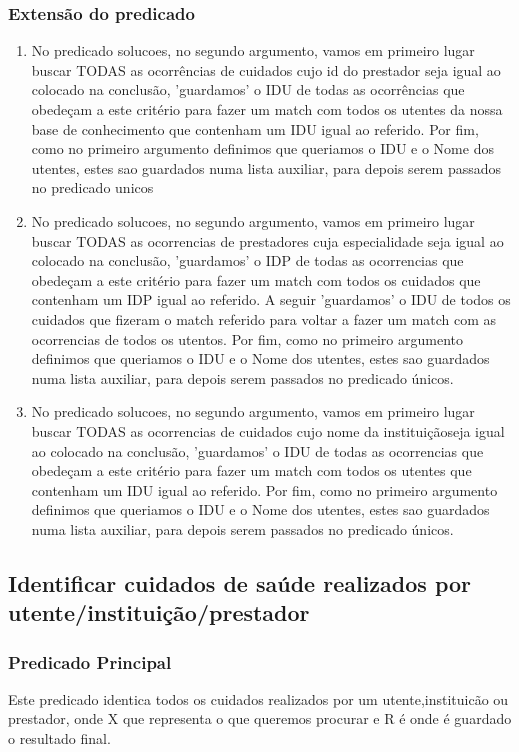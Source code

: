\documentclass[a4paper]{report} %
\begin{document}
\subsubsection{Extensão do predicado}
\begin{enumerate}
\item No predicado solucoes, no segundo argumento, vamos em primeiro lugar buscar TODAS as ocorrências de cuidados cujo id do prestador seja igual ao colocado na conclusão, 'guardamos' o IDU de todas as ocorrências que obedeçam a este critério para fazer um match com todos os utentes da nossa base de conhecimento  que contenham um IDU igual ao referido. Por fim, como no primeiro argumento definimos que queriamos o IDU e o Nome dos utentes, estes sao guardados numa lista auxiliar, para depois serem passados no predicado unicos
\item No predicado solucoes, no segundo argumento, vamos em primeiro lugar buscar TODAS as ocorrencias de prestadores cuja especialidade seja igual ao colocado na conclusão, 'guardamos' o IDP de todas as ocorrencias que obedeçam a este critério para fazer um match com todos os cuidados que contenham um IDP igual ao referido. A seguir 'guardamos' o IDU de todos os cuidados que fizeram o match referido para voltar a fazer um match com as ocorrencias de todos os utentos. Por fim, como no primeiro argumento definimos que queriamos o IDU e o Nome dos utentes, estes sao guardados numa lista auxiliar, para depois serem passados no predicado únicos.
\item No predicado solucoes, no segundo argumento, vamos em primeiro lugar buscar TODAS as ocorrencias de cuidados cujo nome da instituiçãoseja igual ao colocado na conclusão, 'guardamos' o IDU de todas as ocorrencias que obedeçam a este critério para fazer um match com todos os utentes que contenham um IDU igual ao referido. Por fim, como no primeiro argumento definimos que queriamos o IDU e o Nome dos utentes, estes sao guardados numa lista auxiliar, para depois serem passados no predicado únicos.
\end{enumerate}

\subsection{Identificar cuidados de saúde realizados por utente/instituição/prestador}

\subsubsection{Predicado Principal}
Este predicado identica todos os cuidados realizados por um utente,instituicão ou prestador, onde X que representa o que queremos procurar e R é onde é guardado o resultado final.
\end{document}
